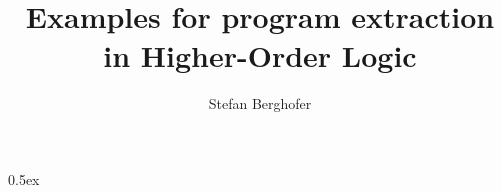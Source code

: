 \documentclass[11pt,a4paper]{article}
\begin{document}
\title{Examples for program extraction in Higher-Order Logic}
\author{Stefan Berghofer}
\maketitle

\nocite{Berger-JAR-2001,Coquand93}

\tableofcontents
\newcommand{\isasymbind}{\isamath{\mathbin{>\!\!\!>\mkern-6.7mu=}}}
\newcommand{\isasymthen}{\isamath{\mathbin{>\!\!\!>}}}

\parindent 0pt\parskip 0.5ex





\end{document}
